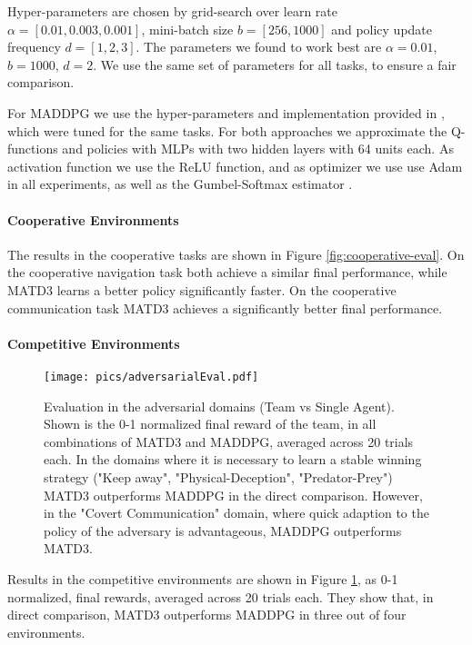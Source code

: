 \documentclass{article}
\begin{document}
Hyper-parameters are chosen by grid-search over learn rate $ \alpha = [0.01, 0.003, 0.001]$, mini-batch size $b = [256, 1000]$ and policy update frequency $ d = [1,2,3]$. 
The parameters we found to work best are $\alpha = 0.01$, $b = 1000$, $d = 2$.
We use the same set of parameters for all tasks, to ensure a fair comparison.

For \gls*{MADDPG} we use the hyper-parameters and implementation provided in \cite{Lowe2017}, which were tuned for the same tasks.
For both approaches we approximate the Q-functions and policies with \glspl*{MLP} with two hidden layers with 64 units each.
As activation function we use the \gls*{ReLU} function, and as optimizer we use use Adam \cite{Kingma2014} in all experiments, as well as the Gumbel-Softmax estimator \cite{Jang2017}.
\paragraph{Cooperative Environments}
The results in the cooperative tasks are shown in Figure \ref{fig:cooperative-eval}. 
On the cooperative navigation task both achieve a similar final performance, while MATD3 learns a better policy significantly faster.
On the cooperative communication task \gls*{MATD3} achieves a significantly better final performance.

\paragraph{Competitive Environments}
\begin{figure}[t]
	
	\texttt{[image: pics/adversarialEval.pdf]}
	\centering
	\caption{Evaluation in the adversarial domains (Team vs Single Agent). 
		Shown is the 0-1 normalized final reward of the team, in all combinations of MATD3 and MADDPG, averaged across 20 trials each.
		In the domains where it is necessary to learn a stable winning strategy ("Keep away", "Physical-Deception", "Predator-Prey") MATD3 outperforms MADDPG in the direct comparison.
		However, in the "Covert Communication" domain, where quick adaption to the policy of the adversary is advantageous, MADDPG outperforms MATD3.
	}
	\label{fig:competitive-eval}
	\vspace{-0.2cm}
\end{figure}
Results in the competitive environments are shown in Figure \ref{fig:competitive-eval}, as 0-1 normalized, final rewards, averaged across 20 trials each.
They show that, in direct comparison, MATD3 outperforms MADDPG in three out of four environments.
\end{document}
